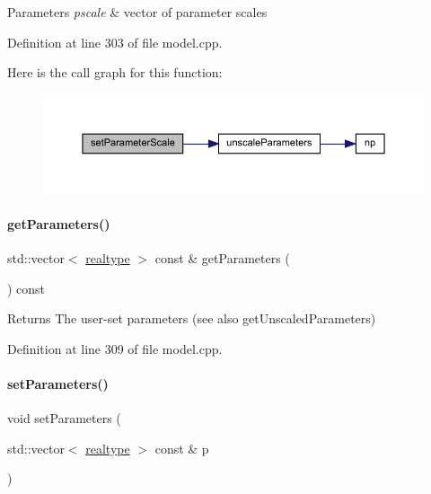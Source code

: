 \begin{DoxyParams}{Parameters}
{\em pscale} & vector of parameter scales \\
\hline
\end{DoxyParams}


Definition at line 303 of file model.\+cpp.

Here is the call graph for this function\+:
\nopagebreak
\begin{figure}[H]
\begin{center}
\leavevmode
\includegraphics[width=350pt]{classamici_1_1_model_a64aee7434ee9f99f004d8dc8eb776bc6_cgraph}
\end{center}
\end{figure}
\mbox{\label{classamici_1_1_model_a1bb7ee08df1e2e42da7dceb2100b6131}} 
\paragraph{\texorpdfstring{get\+Parameters()}{getParameters()}}
{\footnotesize\ttfamily std\+::vector$<$ \mbox{\hyperlink{namespaceamici_a1bdce28051d6a53868f7ccbf5f2c14a3}{realtype}} $>$ const  \& get\+Parameters (\begin{DoxyParamCaption}{ }\end{DoxyParamCaption}) const}

\begin{DoxyReturn}{Returns}
The user-\/set parameters (see also get\+Unscaled\+Parameters) 
\end{DoxyReturn}


Definition at line 309 of file model.\+cpp.

\mbox{\label{classamici_1_1_model_af1e95f6479d442fcb4c63d16763d4acd}} 
\paragraph{\texorpdfstring{set\+Parameters()}{setParameters()}}
{\footnotesize\ttfamily void set\+Parameters (\begin{DoxyParamCaption}\item[{std\+::vector$<$ \mbox{\hyperlink{namespaceamici_a1bdce28051d6a53868f7ccbf5f2c14a3}{realtype}} $>$ const \&}]{p }\end{DoxyParamCaption})}


